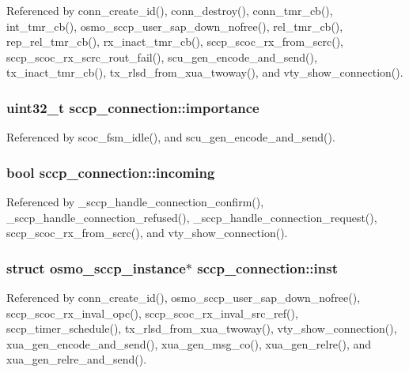 Referenced by conn\+\_\+create\+\_\+id(), conn\+\_\+destroy(), conn\+\_\+tmr\+\_\+cb(), int\+\_\+tmr\+\_\+cb(), osmo\+\_\+sccp\+\_\+user\+\_\+sap\+\_\+down\+\_\+nofree(), rel\+\_\+tmr\+\_\+cb(), rep\+\_\+rel\+\_\+tmr\+\_\+cb(), rx\+\_\+inact\+\_\+tmr\+\_\+cb(), sccp\+\_\+scoc\+\_\+rx\+\_\+from\+\_\+scrc(), sccp\+\_\+scoc\+\_\+rx\+\_\+scrc\+\_\+rout\+\_\+fail(), scu\+\_\+gen\+\_\+encode\+\_\+and\+\_\+send(), tx\+\_\+inact\+\_\+tmr\+\_\+cb(), tx\+\_\+rlsd\+\_\+from\+\_\+xua\+\_\+twoway(), and vty\+\_\+show\+\_\+connection().

\subsubsection[{importance}]{\setlength{\rightskip}{0pt plus 5cm}uint32\+\_\+t sccp\+\_\+connection\+::importance}\label{structsccp__connection_ab06f24ed18d75be8f122c7535e7fb422}


Referenced by scoc\+\_\+fsm\+\_\+idle(), and scu\+\_\+gen\+\_\+encode\+\_\+and\+\_\+send().

\subsubsection[{incoming}]{\setlength{\rightskip}{0pt plus 5cm}bool sccp\+\_\+connection\+::incoming}\label{structsccp__connection_acbbea16064b8753a190a0066c8a8fba8}


Referenced by \+\_\+sccp\+\_\+handle\+\_\+connection\+\_\+confirm(), \+\_\+sccp\+\_\+handle\+\_\+connection\+\_\+refused(), \+\_\+sccp\+\_\+handle\+\_\+connection\+\_\+request(), sccp\+\_\+scoc\+\_\+rx\+\_\+from\+\_\+scrc(), and vty\+\_\+show\+\_\+connection().

\subsubsection[{inst}]{\setlength{\rightskip}{0pt plus 5cm}struct {\bf osmo\+\_\+sccp\+\_\+instance}$\ast$ sccp\+\_\+connection\+::inst}\label{structsccp__connection_a81e1347c3cab7f78e23f3d8f15b17997}


Referenced by conn\+\_\+create\+\_\+id(), osmo\+\_\+sccp\+\_\+user\+\_\+sap\+\_\+down\+\_\+nofree(), sccp\+\_\+scoc\+\_\+rx\+\_\+inval\+\_\+opc(), sccp\+\_\+scoc\+\_\+rx\+\_\+inval\+\_\+src\+\_\+ref(), sccp\+\_\+timer\+\_\+schedule(), tx\+\_\+rlsd\+\_\+from\+\_\+xua\+\_\+twoway(), vty\+\_\+show\+\_\+connection(), xua\+\_\+gen\+\_\+encode\+\_\+and\+\_\+send(), xua\+\_\+gen\+\_\+msg\+\_\+co(), xua\+\_\+gen\+\_\+relre(), and xua\+\_\+gen\+\_\+relre\+\_\+and\+\_\+send().

